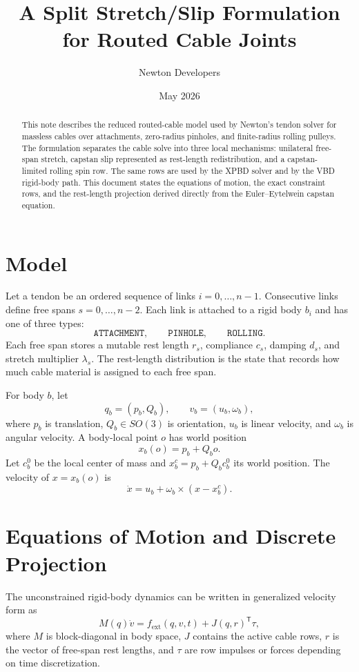 \documentclass[11pt]{article}
\title{A Split Stretch/Slip Formulation for Routed Cable Joints}
\author{Newton Developers}
\date{May 2026}
\newcommand{\T}{\mathsf{T}}
\begin{document}
\maketitle

\begin{abstract}
This note describes the reduced routed-cable model used by Newton's tendon
solver for massless cables over attachments, zero-radius pinholes, and
finite-radius rolling pulleys.  The formulation separates the cable solve into
three local mechanisms: unilateral free-span stretch, capstan slip represented
as rest-length redistribution, and a capstan-limited rolling spin row.  The
same rows are used by the XPBD solver and by the VBD rigid-body path.  This
document states the equations of motion, the exact constraint rows, and the
rest-length projection derived directly from the Euler--Eytelwein capstan
equation.
\end{abstract}

\section{Model}

Let a tendon be an ordered sequence of links $i=0,\ldots,n-1$.  Consecutive
links define free spans $s=0,\ldots,n-2$.  Each link is attached to a rigid
body $b_i$ and has one of three types:
\[
  \texttt{ATTACHMENT}, \qquad \texttt{PINHOLE}, \qquad \texttt{ROLLING}.
\]
Each free span stores a mutable rest length $r_s$, compliance $c_s$, damping
$d_s$, and stretch multiplier $\lambda_s$.  The rest-length distribution is the
state that records how much cable material is assigned to each free span.

For body $b$, let
\[
  q_b = (p_b,Q_b), \qquad v_b = (u_b,\omega_b),
\]
where $p_b$ is translation, $Q_b\in SO(3)$ is orientation, $u_b$ is linear
velocity, and $\omega_b$ is angular velocity.  A body-local point $o$ has world
position
\[
  x_b(o) = p_b + Q_b o.
\]
Let $c_b^0$ be the local center of mass and $x_b^c=p_b+Q_b c_b^0$ its world
position.  The velocity of $x=x_b(o)$ is
\[
  \dot{x} = u_b + \omega_b \times (x-x_b^c).
\]

\section{Equations of Motion and Discrete Projection}

The unconstrained rigid-body dynamics can be written in generalized velocity
form as
\begin{equation}
  M(q)\dot{v} = f_\mathrm{ext}(q,v,t) + J(q,r)^\T \tau,
  \label{eq:eom}
\end{equation}
where $M$ is block-diagonal in body space, $J$ contains the active cable rows,
$r$ is the vector of free-span rest lengths, and $\tau$ are row impulses or
forces depending on time discretization.
\end{document}
